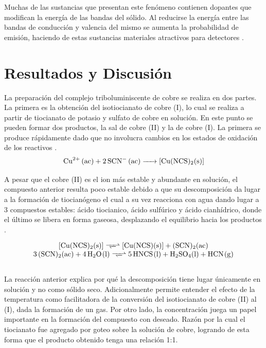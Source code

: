 \documentclass[fleqn,10pt]{SelfArx}
\begin{document}
Muchas de las sustancias que presentan este fen\'omeno contienen dopantes que modifican la energ\'ia de las bandas del s\'olido. Al reducirse la energ\'ia entre las bandas de conducci\'on y valencia del mismo se aumenta la probabilidad de emisi\'on, haciendo de estas sustancias materiales atractivos para detectores \cite{sage_humberstone_oswald_lloyd_bourhill_2001} \cite{olawale_okoli_fontenot_hollerman_2016}.


\section{Resultados y Discusi\'on}
La preparaci\'on del complejo triboluminiscente de cobre se realiza en dos partes. La primera es la obtenci\'on del isotiocianato de cobre (I), lo cual se realiza a partir de tiocianato de potasio y sulfato de cobre en soluci\'on. En este punto se pueden formar dos productos, la sal de cobre (II) y la de cobre (I). La primera se produce r\'apidamente dado que no involucra cambios en los estados de oxidaci\'on de los reactivos \cite{tykodi_1991}\cite{tudela_1993}.
\begin{equation}
	\ce{Cu^{2+} (ac) + 2SCN- (ac) -> [Cu(NCS)2(s)]}
\end{equation}

A pesar que el cobre (II) es el ion m\'as estable y abundante en soluci\'on, el compuesto anterior resulta poco estable debido a que su descomposici\'on da lugar a la formaci\'on de tiocian\'ogeno  el cual a su vez reacciona con agua dando lugar a 3 compuestos estables: \'acido tiocianico, \'acido sulf\'urico y \'acido cianh\'idrico, donde el \'ultimo se libera en forma gaseosa, desplazando el equilibrio hacia los productos \cite{tudela_1993}.

\footnotesize
\begin{equation}
	\begin{array}{c}
		\ce{[Cu(NCS)2(s)] <=>> [Cu(NCS)(s)] + (SCN)2(ac)}\\
		\ce{3(SCN)2(ac) + 4H2O(l) <=>> 5HNCS(l) + H2SO4(l) + HCN(g)}
	\end{array}
\end{equation}
\normalsize
\\

La reacci\'on anterior explica por qu\'e la descomposici\'on tiene lugar \'unicamente en soluci\'on y no como s\'olido seco. Adicionalmente permite entender el efecto de la temperatura como facilitadora de la conversi\'on del isotiocianato de cobre (II) al (I), dada la formaci\'on de un gas. Por otro lado, la concentraci\'on juega un papel importante en la formaci\'on del compuesto con deseado. Raz\'on por la cual el tiocianato fue agregado por goteo sobre la soluci\'on de cobre, logrando de esta forma que el producto obtenido tenga una relaci\'on 1:1.
\end{document}

